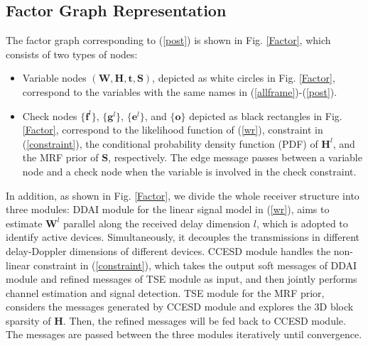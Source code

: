 \documentclass[conference]{IEEEtran}
\begin{document}
	\subsection{Factor Graph Representation}
	The factor graph corresponding to (\ref{post}) is shown in Fig. \ref{Factor}, which consists of two types of nodes:
	\begin{itemize}
		\item Variable nodes $(\mathbf W, \mathbf H, \mathbf t, \mathbf S)$, depicted as white circles in Fig. \ref{Factor}, correspond to the variables with the same names in (\ref{allframe})-(\ref{post}).
		\item Check nodes $\{\mathbf f^l\}$, $\{\mathbf g^l\}$, $\{\mathbf e^l\}$, and $\{\mathbf o\}$ depicted as black rectangles in Fig. \ref{Factor}, correspond to the likelihood function of (\ref{wr}), constraint in (\ref{constraint}), the conditional probability density function (PDF) of $\mathbf H^l$, and the MRF prior of $\mathbf S$, respectively. The edge message passes between a variable node and a check
		node when the variable is involved in the check constraint.
	\end{itemize}
	In addition, as shown in Fig. \ref{Factor}, we divide the whole receiver structure into three modules:
	 DDAI module for the linear signal model in (\ref{wr}), aims to estimate $\mathbf W^l$ parallel along the received delay dimension $l$, which is adopted to identify active devices. Simultaneously, it decouples the transmissions in different delay-Doppler dimensions of different devices.
	 CCESD module handles the non-linear constraint in (\ref{constraint}), which takes the output soft messages of DDAI module and refined messages of TSE module as input, and then jointly performs channel estimation and signal detection.
	 TSE module for the MRF prior, considers the messages generated by CCESD module and explores the 3D block sparsity of $\mathbf H$. Then, the refined messages will be fed back to CCESD module.
The messages are passed between the three modules iteratively until convergence.
\end{document}

